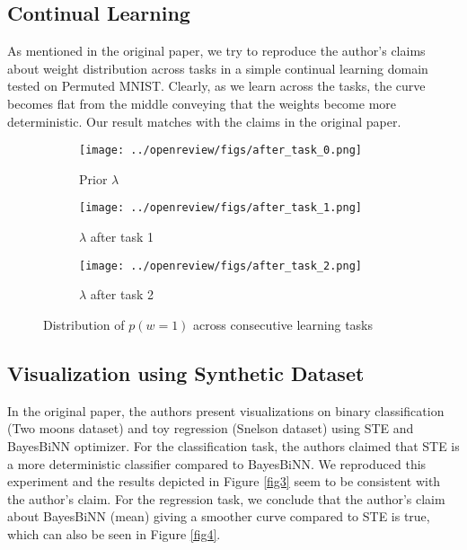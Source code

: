 \subsection{Continual Learning}
As mentioned in the original paper, we try to reproduce the author's claims about weight distribution across tasks in a simple continual learning domain tested on Permuted MNIST. Clearly, as we learn across the tasks, the curve becomes flat from the middle conveying that the weights become more deterministic. Our result matches with the claims in the original paper.
\begin{figure}[h]
     \centering
     \begin{subfigure}[b]{0.3\textwidth}
         \centering
         \texttt{[image: ../openreview/figs/after\_task\_0.png]}
         \caption{Prior $\lambda$}
     \end{subfigure}
     \hfill
     \begin{subfigure}[b]{0.3\textwidth}
         \centering
         \texttt{[image: ../openreview/figs/after\_task\_1.png]}
         \caption{$\lambda$ after task 1}
     \end{subfigure}
     \hfill
     \begin{subfigure}[b]{0.3\textwidth}
         \centering
         \texttt{[image: ../openreview/figs/after\_task\_2.png]}
         \caption{$\lambda$ after task 2}
     \end{subfigure}
        \caption{Distribution of $p(w=1)$ across consecutive learning tasks}
\end{figure}

\subsection{Visualization using Synthetic Dataset}

In the original paper, the authors present visualizations on binary classification (Two moons dataset\citet{r10}) and toy regression (Snelson dataset\citet{r9}) using STE and BayesBiNN optimizer. For the classification task, the authors claimed that STE is a more deterministic classifier compared to BayesBiNN. We reproduced this experiment and the results depicted in Figure \autoref{fig3} seem to be consistent with the author's claim. For the regression task, we conclude that the author's claim about BayesBiNN (mean) giving a smoother curve compared to STE is true, which can also be seen in Figure \autoref{fig4}. 


